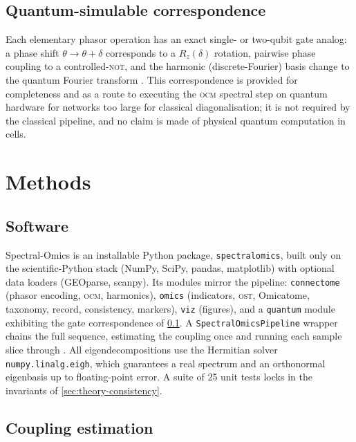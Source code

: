 \documentclass[preprint,12pt,amsmath,amssymb,superscriptaddress,floatfix]{revtex4-2}
\theoremstyle{definition}
\theoremstyle{plain}
\newcommand{\OCM}{\textsc{ocm}}
\newcommand{\OST}{\textsc{ost}}
\begin{document}
\subsection{Quantum-simulable correspondence}
\label{sec:theory-quantum}

Each elementary phasor operation has an exact single- or two-qubit gate analog:
a phase shift $\theta\to\theta+\delta$ corresponds to a $R_z(\delta)$ rotation,
pairwise phase coupling to a controlled-\textsc{not}, and the harmonic
(discrete-Fourier) basis change to the quantum Fourier transform
\citep{nielsen2010quantum}. This correspondence is provided for completeness and
as a route to executing the \OCM{} spectral step on quantum hardware for
networks too large for classical diagonalisation; it is not required by the
classical pipeline, and no claim is made of physical quantum computation in
cells.

\section{Methods}
\label{sec:methods}

\subsection{Software}

Spectral-Omics is an installable Python package, \texttt{spectralomics}, built
only on the scientific-Python stack (NumPy, SciPy, pandas, matplotlib) with
optional data loaders (GEOparse, scanpy). Its modules mirror the pipeline:
\texttt{connectome} (phasor encoding, \OCM, harmonics), \texttt{omics}
(indicators, \OST, Omicatome, taxonomy, record, consistency, markers),
\texttt{viz} (figures), and a \texttt{quantum} module exhibiting the gate
correspondence of \cref{sec:theory-quantum}. A \texttt{SpectralOmicsPipeline}
wrapper chains the full sequence, estimating the coupling once and running each
sample slice through . All eigendecompositions use the
Hermitian solver \texttt{numpy.linalg.eigh}, which guarantees a real spectrum and
an orthonormal eigenbasis up to floating-point error. A suite of 25 unit tests
locks in the invariants of \cref{sec:theory-consistency}.

\subsection{Coupling estimation}
\end{document}
